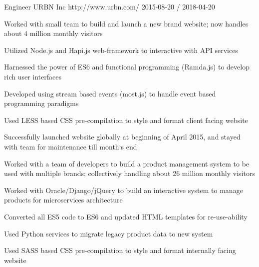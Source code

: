 \begin{cventries}
 
  \cventry
    {Engineer}
    {URBN Inc}
    {http://www.urbn.com/}
    {2015-08-20 / 2018-04-20}
    {
          \begin{cvitems}
                \item{Worked with small team to build and launch a new brand website; now handles about 4 million monthly visitors}
                    \begin{cvitemssub}
                        \item{Utilized Node.js and Hapi.js web-framework to interactive with API services}
                        \item{Harnessed the power of ES6 and functional programming (Ramda.js) to develop rich user interfaces}
                        \item{Developed using stream based events (most.js) to handle event based programming paradigms}
                        \item{Used LESS based CSS pre-compilation to style and format client facing website}
                        \item{Successfully launched website globally at beginning of April 2015, and stayed with team for maintenance till month`s end}
                    \end{cvitemssub}
                \item{Worked with a team of developers to build a product management system to be used with multiple brands; collectively handling about 26 million monthly visitors}
                    \begin{cvitemssub}
                        \item{Worked with Oracle/Django/jQuery to build an interactive system to manage products for microservices architecture}
                        \item{Converted all ES5 code to ES6 and updated HTML templates for re-use-ability}
                        \item{Used Python services to migrate legacy product data to new system}
                        \item{Used SASS based CSS pre-compilation to style and format internally facing website}

\end{cvitemssub}
\end{cvitems}}
\end{cventries}

